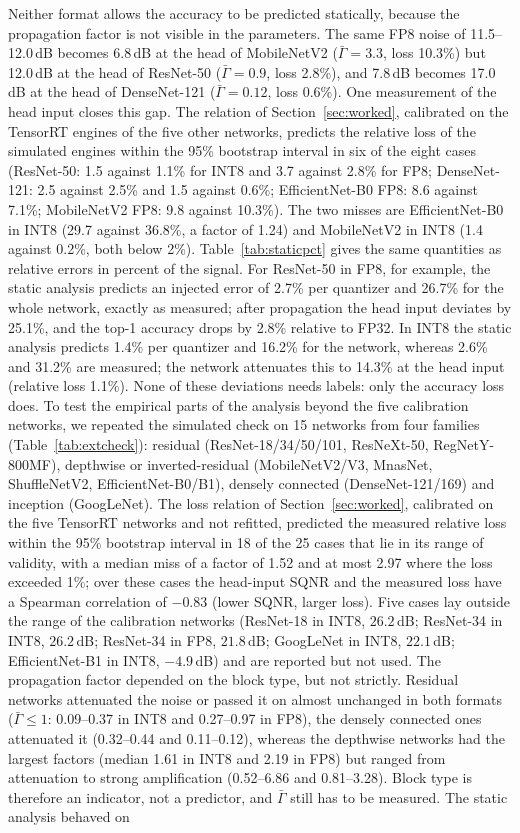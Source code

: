 \documentclass[pdflatex,sn-mathphys-num]{sn-jnl}%
\theoremstyle{thmstyleone}%
\theoremstyle{thmstyletwo}%
\theoremstyle{thmstylethree}%
\begin{document}
Neither format allows the accuracy to be predicted statically, because the propagation factor is not visible in the parameters. The same FP8 noise of 11.5--12.0\,dB becomes 6.8\,dB at the head of MobileNetV2 ($\bar\Gamma=3.3$, loss 10.3\%) but 12.0\,dB at the head of ResNet-50 ($\bar\Gamma=0.9$, loss 2.8\%), and 7.8\,dB becomes 17.0\,dB at the head of DenseNet-121 ($\bar\Gamma=0.12$, loss 0.6\%). One measurement of the head input closes this gap. The relation of Section~\ref{sec:worked}, calibrated on the TensorRT engines of the five other networks, predicts the relative loss of the simulated engines within the 95\% bootstrap interval in six of the eight cases (ResNet-50: 1.5 against 1.1\% for INT8 and 3.7 against 2.8\% for FP8; DenseNet-121: 2.5 against 2.5\% and 1.5 against 0.6\%; EfficientNet-B0 FP8: 8.6 against 7.1\%; MobileNetV2 FP8: 9.8 against 10.3\%). The two misses are EfficientNet-B0 in INT8 (29.7 against 36.8\%, a factor of 1.24) and MobileNetV2 in INT8 (1.4 against 0.2\%, both below 2\%). Table~\ref{tab:staticpct} gives the same quantities as relative errors in percent of the signal. For ResNet-50 in FP8, for example, the static analysis predicts an injected error of 2.7\% per quantizer and 26.7\% for the whole network, exactly as measured; after propagation the head input deviates by 25.1\%, and the top-1 accuracy drops by 2.8\% relative to FP32. In INT8 the static analysis predicts 1.4\% per quantizer and 16.2\% for the network, whereas 2.6\% and 31.2\% are measured; the network attenuates this to 14.3\% at the head input (relative loss 1.1\%). None of these deviations needs labels: only the accuracy loss does. To test the empirical parts of the analysis beyond the five calibration networks, we repeated the simulated check on 15 networks from four families (Table~\ref{tab:extcheck}): residual (ResNet-18/34/50/101, ResNeXt-50, RegNetY-800MF), depthwise or inverted-residual (MobileNetV2/V3, MnasNet, ShuffleNetV2, EfficientNet-B0/B1), densely connected (DenseNet-121/169) and inception (GoogLeNet). The loss relation of Section~\ref{sec:worked}, calibrated on the five TensorRT networks and not refitted, predicted the measured relative loss within the 95\% bootstrap interval in 18 of the 25 cases that lie in its range of validity, with a median miss of a factor of 1.52 and at most 2.97 where the loss exceeded 1\%; over these cases the head-input SQNR and the measured loss have a Spearman correlation of $-0.83$ (lower SQNR, larger loss). Five cases lay outside the range of the calibration networks (ResNet-18 in INT8, $26.2$\,dB; ResNet-34 in INT8, $26.2$\,dB; ResNet-34 in FP8, $21.8$\,dB; GoogLeNet in INT8, $22.1$\,dB; EfficientNet-B1 in INT8, $-4.9$\,dB) and are reported but not used. The propagation factor depended on the block type, but not strictly. Residual networks attenuated the noise or passed it on almost unchanged in both formats ($\bar\Gamma\le1$: 0.09--0.37 in INT8 and 0.27--0.97 in FP8), the densely connected ones attenuated it (0.32--0.44 and 0.11--0.12), whereas the depthwise networks had the largest factors (median 1.61 in INT8 and 2.19 in FP8) but ranged from attenuation to strong amplification (0.52--6.86 and 0.81--3.28). Block type is therefore an indicator, not a predictor, and $\bar\Gamma$ still has to be measured. The static analysis behaved on 
\end{document}
